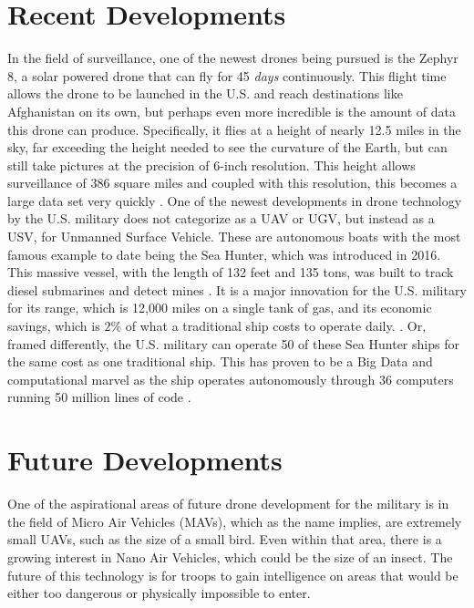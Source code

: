 \documentclass[sigconf]{acmart}
\begin{document}
\section{Recent Developments}
In the field of surveillance, one of the newest drones being pursued is the Zephyr 8, a solar powered drone that can fly for 45 \emph{days} continuously. This flight time allows the drone to be launched in the U.S. and reach destinations like Afghanistan on its own, but perhaps even more incredible is the amount of data this drone can produce. Specifically, it flies at a height of nearly 12.5 miles in the sky, far exceeding the height needed to see the curvature of the Earth, but can still take pictures at the precision of 6-inch resolution. This height allows surveillance of 386 square miles and coupled with this resolution, this becomes a large data set very quickly \cite{foxdrone}. 
One of the newest developments in drone technology by the U.S. military does not categorize as a UAV or UGV, but instead as a USV, for Unmanned Surface Vehicle. These are autonomous boats with the most famous example to date being the Sea Hunter, which was introduced in 2016. This massive vessel, with the length of 132 feet and 135 tons, was built to track diesel submarines and detect mines \cite{seahunter}. It is a major innovation for the U.S. military for its range, which is 12,000 miles on a single tank of gas, and its economic savings, which is $2\%$ of what a traditional ship costs to operate daily. \cite{seahuntergas} \cite{seahuntercost}. Or, framed differently, the U.S. military can operate 50 of these Sea Hunter ships for the same cost as one traditional ship. This has proven to be a Big Data and computational marvel as the ship operates autonomously through 36 computers running 50 million lines of code \cite{60minutes}.

\section{Future Developments}
One of the aspirational areas of future drone development for the military is in the field of Micro Air Vehicles (MAVs), which as the name implies, are extremely small UAVs, such as the size of a small bird. Even within that area, there is a growing interest in Nano Air Vehicles, which could be the size of an insect. The future of this technology is for troops to gain intelligence on areas that would be either too dangerous or physically impossible to enter. 
\end{document}
